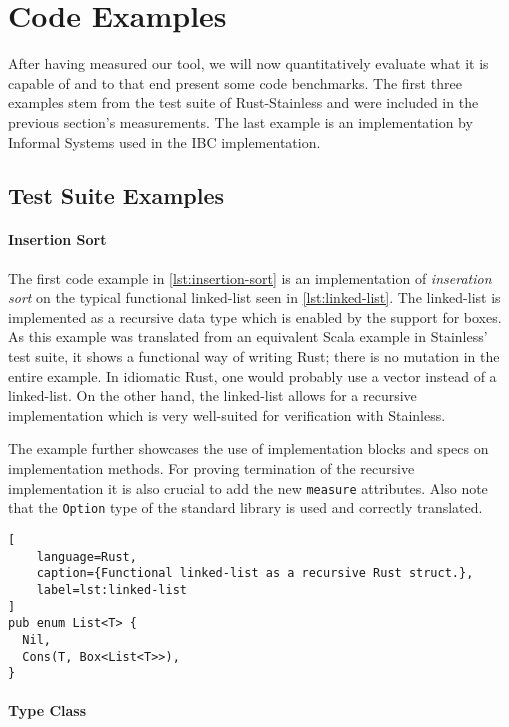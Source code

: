 


\section{Code Examples}

After having measured our tool, we will now quantitatively evaluate what it is
capable of and to that end present some code benchmarks. The first three
examples stem from the test suite of Rust-Stainless and were included in the
previous section's measurements. The last example is an implementation by
Informal Systems used in the IBC implementation.

\subsection{Test Suite Examples}

\paragraph{Insertion Sort}

The first code example in \autoref{lst:insertion-sort} is an implementation of
\emph{inseration sort} on the typical functional linked-list seen in
\autoref{lst:linked-list}. The linked-list is implemented as a recursive data
type which is enabled by the support for boxes. As this example was translated
from an equivalent Scala example in Stainless' test suite, it shows a functional
way of writing Rust; there is no mutation in the entire example. In idiomatic
Rust, one would probably use a vector instead of a linked-list. On the other
hand, the linked-list allows for a recursive implementation which is very
well-suited for verification with Stainless.

The example further showcases the use of implementation blocks and specs on
implementation methods. For proving termination of the recursive implementation
it is also crucial to add the new \lstinline!measure! attributes. Also note that
the \lstinline!Option! type of  the standard library is used and correctly
translated.

\begin{lstlisting}[
    language=Rust,
    caption={Functional linked-list as a recursive Rust struct.},
    label=lst:linked-list
]
pub enum List<T> {
  Nil,
  Cons(T, Box<List<T>>),
}
\end{lstlisting}

\paragraph{Type Class}

